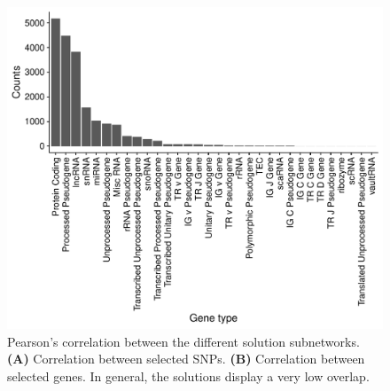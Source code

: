 \documentclass[twocolumn, 10pt]{article}
\begin{document}
\begin{figure}[htbp]
\centering
\includegraphics[width=.9\linewidth]{./figures/sfigure_3.pdf}
\caption{\label{sfig:pearson_methods}
Pearson's correlation between the different solution subnetworks. \textbf{(A)} Correlation between selected SNPs. \textbf{(B)} Correlation between selected genes. In general, the solutions display a very low overlap.}
\end{figure}
\end{document}
